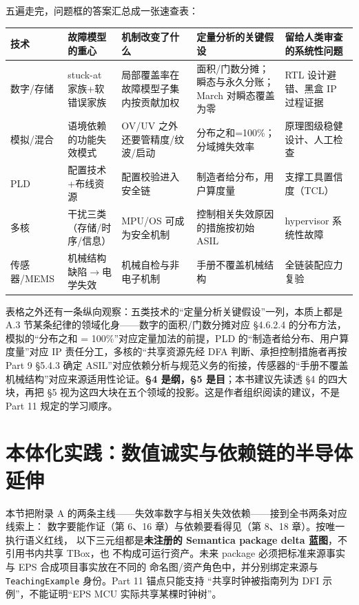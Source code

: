 五遍走完，问题框的答案汇总成一张速查表：

\begin{center}
\begingroup\small
\setlength{\tabcolsep}{4pt}
\begin{tabularx}{\linewidth}{@{}XXXXX@{}}
\toprule
技术 & 故障模型的重心 & 机制改变了什么 & 定量分析的关键假设 & 留给人类审查的系统性问题 \\
\midrule
数字/存储 & stuck-at 家族+软错误家族 & 局部覆盖率在故障模型子集内按贡献加权 & 面积/门数分摊；瞬态与永久分账；March 对瞬态覆盖为零 & RTL 设计避错、黑盒 IP 过程证据 \\
模拟/混合 & 语境依赖的功能失效模式 & OV/UV 之外还要管精度/纹波/启动 & 分布之和=100\%；分域摊失效率 & 原理图级稳健设计、人工检查 \\
PLD & 配置技术+布线资源 & 配置校验进入安全链 & 制造者给分布，用户算度量 & 支撑工具置信度（TCL） \\
多核 & 干扰三类（存储/时序/信息） & MPU/OS 可成为安全机制 & 控制相关失效原因的措施按初始 ASIL & hypervisor 系统性故障 \\
传感器/MEMS & 机械结构缺陷\(\rightarrow\)电学失效 & 机械自检与非电子机制 & 手册不覆盖机械结构 & 全链装配应力复验 \\
\bottomrule
\end{tabularx}
\endgroup
\end{center}

表格之外还有一条纵向观察：五类技术的“定量分析关键假设”一列，本质上都是 A.3 节某条纪律的领域化身——数字的面积/门数分摊对应 §4.6.2.4 的分布方法，模拟的“分布之和 = 100\%”对应定量加法的前提，PLD 的“制造者给分布、用户算度量”对应 IP 责任分工，多核的“共享资源先经 DFA 判断、承担控制措施者再按 Part 9 §5.4.3 确定 ASIL”对应依赖分析与规范义务的衔接，传感器的“手册不覆盖机械结构”对应来源适用性论证。\textbf{§4 是纲，§5 是目}；本书建议先读透 §4 的四大块，再把 §5 视为这四大块在五个领域的投影。这是作者组织阅读的建议，不是 Part 11 规定的学习顺序。

\section{本体化实践：数值诚实与依赖链的半导体延伸}

本节把附录 A 的两条主线——失效率数字与相关失效依赖——接到全书两条对应线索上：
数字要能作证（第 6、16 章）与依赖要看得见（第 8、18 章）。按唯一执行语义红线，
以下三元组都是\textbf{未注册的 Semantica package delta 蓝图}，不引用书内共享 TBox，也
不构成可运行资产。未来 package 必须把标准来源事实与 EPS 合成项目事实放在不同的
命名图/资产角色中，并分别绑定来源与 \nolinkurl{TeachingExample} 身份。Part 11 锚点只能支持
“共享时钟被指南列为 DFI 示例”，不能证明“EPS MCU 实际共享某棵时钟树”。

